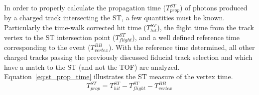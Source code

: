 


In order to properly calculate the propagation time ($T^{ST}_{prop}$) of photons produced by a charged track intersecting the ST, a few quantities must be known.  Particularly the time-walk corrected hit time ($T^{ST}_{hit}$), the flight time from the track vertex to the ST intersection point ($T^{ST}_{flight}$), and a well defined reference time corresponding to the event ($T^{BB}_{vertex}$).  With the reference time determined, all other charged tracks passing the previously discussed fiducial track selection and which have a match to the ST (and not the TOF) are analyzed.  Equation~\ref{eq:st_prop_time} illustrates the ST measure of the vertex time.
	\begin{equation} \label{eq:st_prop_time}
		T^{ST}_{prop} = T^{ST}_{hit} - T^{ST}_{flight} - T^{BB}_{vertex}
	\end{equation} 

